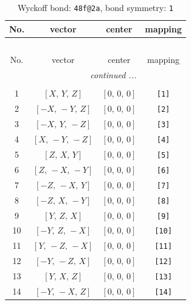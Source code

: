 \documentclass[fleqn,8pt]{jsarticle}
\begin{document}
\begin{longtable}{cccc}
\caption{Wyckoff bond: {\tt 48f@2a}, bond symmetry: {\tt 1}}
 \\
 \hline \hline
No. & vector & center & mapping \\ \hline \endfirsthead

\multicolumn{3}{l}{\tablename\ \thetable{}} \\
 \hline \hline
No. & vector & center & mapping \\ \hline \endhead

 \hline \hline
\multicolumn{3}{r}{\footnotesize\it continued ...} \\ \endfoot

 \hline \hline
\multicolumn{3}{r}{} \\ \endlastfoot

1 & $\left[ X,\, Y,\, Z \right]$ & $\left[ 0,\, 0,\, 0 \right]$ & {\tt [1]} \\ \hline
2 & $\left[ - X,\, - Y,\, Z \right]$ & $\left[ 0,\, 0,\, 0 \right]$ & {\tt [2]} \\ \hline
3 & $\left[ - X,\, Y,\, - Z \right]$ & $\left[ 0,\, 0,\, 0 \right]$ & {\tt [3]} \\ \hline
4 & $\left[ X,\, - Y,\, - Z \right]$ & $\left[ 0,\, 0,\, 0 \right]$ & {\tt [4]} \\ \hline
5 & $\left[ Z,\, X,\, Y \right]$ & $\left[ 0,\, 0,\, 0 \right]$ & {\tt [5]} \\ \hline
6 & $\left[ Z,\, - X,\, - Y \right]$ & $\left[ 0,\, 0,\, 0 \right]$ & {\tt [6]} \\ \hline
7 & $\left[ - Z,\, - X,\, Y \right]$ & $\left[ 0,\, 0,\, 0 \right]$ & {\tt [7]} \\ \hline
8 & $\left[ - Z,\, X,\, - Y \right]$ & $\left[ 0,\, 0,\, 0 \right]$ & {\tt [8]} \\ \hline
9 & $\left[ Y,\, Z,\, X \right]$ & $\left[ 0,\, 0,\, 0 \right]$ & {\tt [9]} \\ \hline
10 & $\left[ - Y,\, Z,\, - X \right]$ & $\left[ 0,\, 0,\, 0 \right]$ & {\tt [10]} \\ \hline
11 & $\left[ Y,\, - Z,\, - X \right]$ & $\left[ 0,\, 0,\, 0 \right]$ & {\tt [11]} \\ \hline
12 & $\left[ - Y,\, - Z,\, X \right]$ & $\left[ 0,\, 0,\, 0 \right]$ & {\tt [12]} \\ \hline
13 & $\left[ Y,\, X,\, Z \right]$ & $\left[ 0,\, 0,\, 0 \right]$ & {\tt [13]} \\ \hline
14 & $\left[ - Y,\, - X,\, Z \right]$ & $\left[ 0,\, 0,\, 0 \right]$ & {\tt [14]} \\ \hline

\end{longtable}
\end{document}
